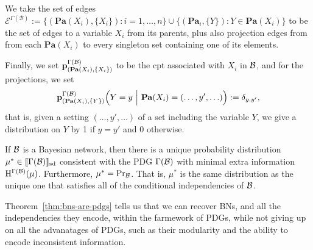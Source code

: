 \documentclass{article}
\DeclarePairedDelimiter{\SD}{\llbracket}{\rrbracket_{\text{sd}}}
\newcommand{\Ed}{\mathcal E}
\newcommand\Pa{\mathbf{Pa}}
\numberwithin{equation}{section}
\begin{document}
\begin{defn}
We take the set of edges $\Ed^{\Gamma(\mathcal B)} := \{ (\Pa(X_i), \{X_i\}) :
                i = 1, \ldots, n \} \cup \{ (\Pa_i, \{Y\}) : Y \in
                \Pa(X_i)\}$ to be the set of edges to a variable $X_i$
                from its parents, plus also projection edges from
               from each $\Pa(X_i)$ to every singleton set containing one of its elements.

		Finally, we set $\mat p^{\Gamma(\mathcal B)}_{(\Pa(X_i), \{X_i\})}$ to be the cpt associated with $X_i$ in $\cal B$, and for the projections, we set 
		\[ \mat p^{\Gamma(\mathcal B)}_{(\Pa(X_i), \{Y\})}\Big(Y = y \ \Big|\ \Pa(X_i) = (\ldots, y', \ldots)\Big) := \delta_{y,y'}, \]
		that is, given a setting $(\ldots, y', \ldots)$ of a set including the variable $Y$, we give a distribution on $Y$ by  1 if $y = y'$ and 0 otherwise.
	\end{defn}
	
	
	\begin{theorem}[restate=thmbnsRpdgs]\label{thm:bns-are-pdgs}
		If $\cal B$ is a Bayesian network, then there is a
                unique probability distribution $\mu^* \in
                \SD{\Gamma(\mathcal B)}$ consistent with the PDG
                $\Gamma(\cal B)$ with minimal extra information
                $\mathrm{H}^{\Gamma(\mathcal B)}(\mu)$. Furthermore, $\mu^* =
                \Pr_{\cal B}$. That is, $\mu^*$ is the same
                distribution as the unique one that satisfies all of
                the conditional independencies of $\cal B$.	 
	\end{theorem}

Theorem~\ref{thm:bns-are-pdgs} tells us that we can recover BNs, and
all the independencies they encode, within the farmework of PDGs,
while not giving up on all the advanatages of PDGs, such as their
modularity and the ability to encode inconsistent information.
        
\end{document}
